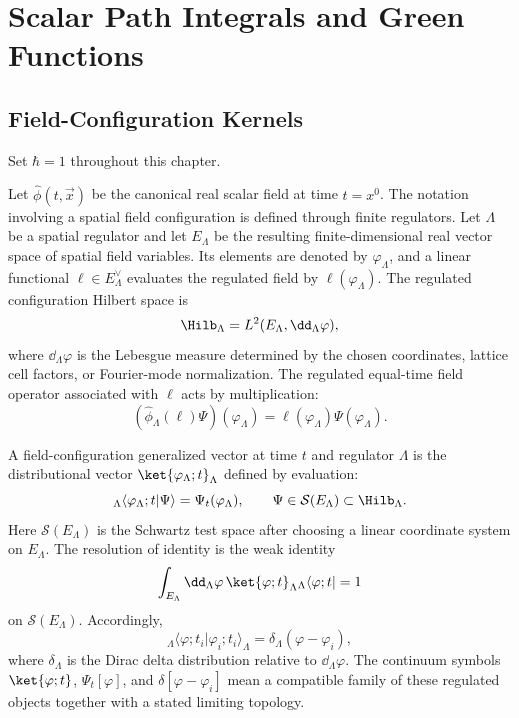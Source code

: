 \chapter{Scalar Path Integrals and Green Functions}
\label{ch:scalar-path-integrals-green-functions}
\ConventionsMixed


\section{Field-Configuration Kernels}

\begin{convention}[Units]
\label{conv:scalar-path-integral-hbar-one}
Set \(\hbar=1\) throughout this chapter.
\end{convention}

\begin{definition}
\label{def:regulated-equal-time-configuration-representation}
Let \(\widehat\phi(t,\vec x)\) be the canonical real scalar field at time
\(t=x^0\).  The notation involving a spatial field configuration is defined
through finite regulators.  Let \(\Lambda\) be a spatial regulator and let
\(E_\Lambda\) be the resulting finite-dimensional real vector space of spatial
field variables.  Its elements are denoted by \(\varphi_\Lambda\), and a
linear functional \(\ell\in E_\Lambda^\vee\) evaluates the regulated field by
\(\ell(\varphi_\Lambda)\).  The regulated configuration Hilbert space is
\[
  \Hilb_\Lambda=L^2(E_\Lambda,\dd_\Lambda\varphi),
\]
where \(\dd_\Lambda\varphi\) is the Lebesgue measure determined by the chosen
coordinates, lattice cell factors, or Fourier-mode normalization.  The
regulated equal-time field operator associated with \(\ell\) acts by
multiplication:
\[
  (\widehat\phi_\Lambda(\ell)\Psi)(\varphi_\Lambda)
  =
  \ell(\varphi_\Lambda)\Psi(\varphi_\Lambda).
\]

A field-configuration generalized vector at time \(t\) and regulator
\(\Lambda\) is the distributional vector \(\ket{\varphi_\Lambda;t}_\Lambda\)
defined by evaluation:
\[
  {}_\Lambda\langle\varphi_\Lambda;t|\Psi\rangle
  =
  \Psi_t(\varphi_\Lambda),
  \qquad
  \Psi\in\mathcal S(E_\Lambda)\subset\Hilb_\Lambda .
\]
Here \(\mathcal S(E_\Lambda)\) is the Schwartz test space after choosing a
linear coordinate system on \(E_\Lambda\).  The resolution of identity is the
weak identity
\[
  \int_{E_\Lambda}\dd_\Lambda\varphi\,
  \ket{\varphi;t}_\Lambda{}_\Lambda\langle\varphi;t|
  =
  1
\]
on \(\mathcal S(E_\Lambda)\).  Accordingly,
\[
  {}_\Lambda\langle\varphi;t_i|\varphi_i;t_i\rangle_\Lambda
  =
  \delta_\Lambda(\varphi-\varphi_i),
\]
where \(\delta_\Lambda\) is the Dirac delta distribution relative to
\(\dd_\Lambda\varphi\).  The continuum symbols
\(\ket{\varphi;t}\), \(\Psi_t[\varphi]\), and \(\delta[\varphi-\varphi_i]\)
mean a compatible family of these regulated objects together with a stated
limiting topology.
\end{definition}

